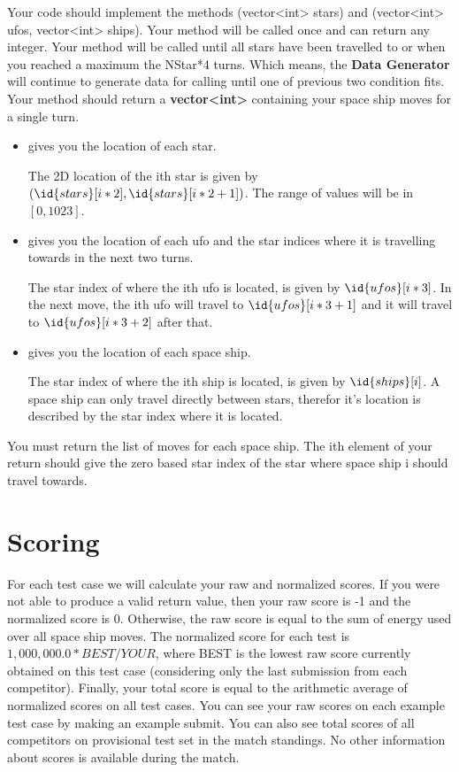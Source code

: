 \documentclass[hyperref,UTF8]{ctexart}
\theoremstyle{definition}
\theoremstyle{remark}
\numberwithin{equation}{subsection}
\newcommand{\Emph}{\textbf}
\begin{document}
	Your code should implement the methods (vector<int> stars) and (vector<int> ufos, vector<int> ships).
	Your  method will be called once and can return any integer.
	Your  method will be called until all stars have been travelled to or when you reached a maximum the NStar*4 turns.
	Which means, the \Emph{Data Generator} will continue to generate data for calling 
	until one of previous two condition fits.
	Your  method should return a \Emph{vector<int>} containing your space ship moves for a single turn.
	\begin{itemize}
		\item {} gives you the location of each star.
		
		The 2D location of the ith star is given by $(\id{stars}[i*2], \id{stars}[i*2+1])$.
		The range of values will be in $[0, 1023]$.
		
		\item {} gives you the location of each ufo and the star indices where it is travelling towards in the next two turns.
		
		The star index of where the ith ufo is located, is given by $\id{ufos}[i*3]$.
		In the next move, the ith ufo will travel to $\id{ufos}[i*3+1]$ and it will travel to $\id{ufos}[i*3+2]$ after that.
		
		\item {} gives you the location of each space ship.
		
		The star index of where the ith ship is located, is given by $\id{ships}[i]$.
		A space ship can only travel directly between stars, therefor it's location is described by the star index where it is located.
		
	\end{itemize}
	You must return the list of moves for each space ship.
	The ith element of your return should give the zero based star index of the star where space ship i should travel towards.

\section{Scoring}	
\label{sec:scoring}

	For each test case we will calculate your raw and normalized scores.
	If you were not able to produce a valid return value, then your raw score is -1 and the normalized score is 0.
	Otherwise, the raw score is equal to the sum of energy used over all space ship moves.
	The normalized score for each test is $1,000,000.0 * BEST / YOUR$,
	where BEST is the lowest raw score currently obtained on this test case (considering only the last submission from each competitor).
	Finally, your total score is equal to the arithmetic average of normalized scores on all test cases.
	You can see your raw scores on each example test case by making an example submit.
	You can also see total scores of all competitors on provisional test set in the match standings.
	No other information about scores is available during the match.
\end{document}
